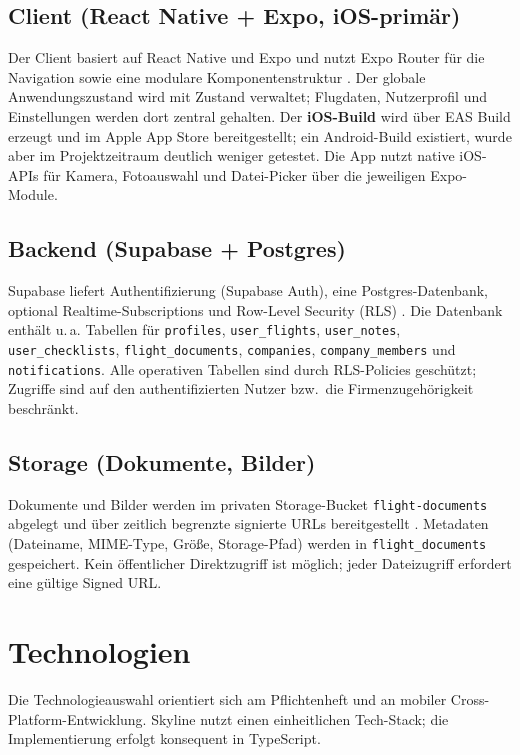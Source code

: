 \subsection{Client (React Native + Expo, iOS-primär)}
Der Client basiert auf React Native und Expo und nutzt Expo Router für die
Navigation sowie eine modulare Komponentenstruktur \cite{reactNative,expoDocs}.
Der globale Anwendungszustand wird mit Zustand verwaltet; Flugdaten, Nutzerprofil
und Einstellungen werden dort zentral gehalten. Der \textbf{iOS-Build} wird über
EAS Build erzeugt und im Apple App Store bereitgestellt; ein Android-Build
existiert, wurde aber im Projektzeitraum deutlich weniger getestet. Die App
nutzt native iOS-APIs für Kamera, Fotoauswahl und Datei-Picker über die
jeweiligen Expo-Module.

\subsection{Backend (Supabase + Postgres)}
Supabase liefert Authentifizierung (Supabase Auth), eine Postgres-Datenbank,
optional Realtime-Subscriptions und Row-Level Security (RLS)
\cite{supabasePlatform,supabaseAuth,supabaseRLS}. Die Datenbank enthält u.\,a.
Tabellen für \texttt{profiles}, \texttt{user\_flights}, \texttt{user\_notes},
\texttt{user\_checklists}, \texttt{flight\_documents}, \texttt{companies},
\texttt{company\_members} und \texttt{notifications}. Alle operativen Tabellen
sind durch RLS-Policies geschützt; Zugriffe sind auf den authentifizierten
Nutzer bzw.\ die Firmenzugehörigkeit beschränkt.

\subsection{Storage (Dokumente, Bilder)}
Dokumente und Bilder werden im privaten Storage-Bucket \texttt{flight-documents}
abgelegt und über zeitlich begrenzte signierte URLs bereitgestellt
\cite{supabaseStorage}. Metadaten (Dateiname, MIME-Type, Größe, Storage-Pfad)
werden in \texttt{flight\_documents} gespeichert. Kein öffentlicher Direktzugriff
ist möglich; jeder Dateizugriff erfordert eine gültige Signed URL.
\section{Technologien}
Die Technologieauswahl orientiert sich am Pflichtenheft und an mobiler
Cross-Platform-Entwicklung. Skyline nutzt einen einheitlichen Tech-Stack;
die Implementierung erfolgt konsequent in TypeScript.


